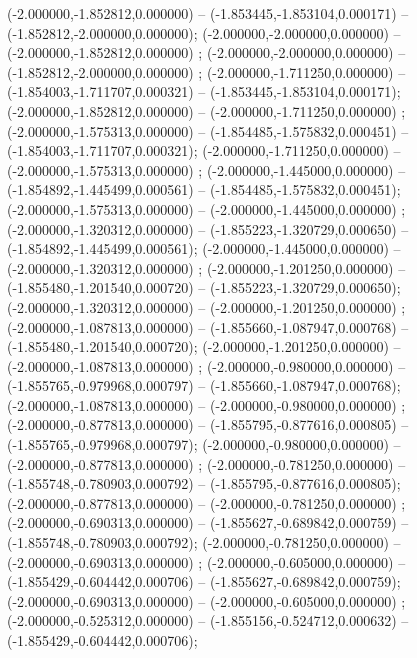  (-2.000000,-1.852812,0.000000) -- (-1.853445,-1.853104,0.000171) -- (-1.852812,-2.000000,0.000000);
 (-2.000000,-2.000000,0.000000) -- (-2.000000,-1.852812,0.000000) ;
 (-2.000000,-2.000000,0.000000) -- (-1.852812,-2.000000,0.000000) ;
 (-2.000000,-1.711250,0.000000) -- (-1.854003,-1.711707,0.000321) -- (-1.853445,-1.853104,0.000171);
 (-2.000000,-1.852812,0.000000) -- (-2.000000,-1.711250,0.000000) ;
 (-2.000000,-1.575313,0.000000) -- (-1.854485,-1.575832,0.000451) -- (-1.854003,-1.711707,0.000321);
 (-2.000000,-1.711250,0.000000) -- (-2.000000,-1.575313,0.000000) ;
 (-2.000000,-1.445000,0.000000) -- (-1.854892,-1.445499,0.000561) -- (-1.854485,-1.575832,0.000451);
 (-2.000000,-1.575313,0.000000) -- (-2.000000,-1.445000,0.000000) ;
 (-2.000000,-1.320312,0.000000) -- (-1.855223,-1.320729,0.000650) -- (-1.854892,-1.445499,0.000561);
 (-2.000000,-1.445000,0.000000) -- (-2.000000,-1.320312,0.000000) ;
 (-2.000000,-1.201250,0.000000) -- (-1.855480,-1.201540,0.000720) -- (-1.855223,-1.320729,0.000650);
 (-2.000000,-1.320312,0.000000) -- (-2.000000,-1.201250,0.000000) ;
 (-2.000000,-1.087813,0.000000) -- (-1.855660,-1.087947,0.000768) -- (-1.855480,-1.201540,0.000720);
 (-2.000000,-1.201250,0.000000) -- (-2.000000,-1.087813,0.000000) ;
 (-2.000000,-0.980000,0.000000) -- (-1.855765,-0.979968,0.000797) -- (-1.855660,-1.087947,0.000768);
 (-2.000000,-1.087813,0.000000) -- (-2.000000,-0.980000,0.000000) ;
 (-2.000000,-0.877813,0.000000) -- (-1.855795,-0.877616,0.000805) -- (-1.855765,-0.979968,0.000797);
 (-2.000000,-0.980000,0.000000) -- (-2.000000,-0.877813,0.000000) ;
 (-2.000000,-0.781250,0.000000) -- (-1.855748,-0.780903,0.000792) -- (-1.855795,-0.877616,0.000805);
 (-2.000000,-0.877813,0.000000) -- (-2.000000,-0.781250,0.000000) ;
 (-2.000000,-0.690313,0.000000) -- (-1.855627,-0.689842,0.000759) -- (-1.855748,-0.780903,0.000792);
 (-2.000000,-0.781250,0.000000) -- (-2.000000,-0.690313,0.000000) ;
 (-2.000000,-0.605000,0.000000) -- (-1.855429,-0.604442,0.000706) -- (-1.855627,-0.689842,0.000759);
 (-2.000000,-0.690313,0.000000) -- (-2.000000,-0.605000,0.000000) ;
 (-2.000000,-0.525312,0.000000) -- (-1.855156,-0.524712,0.000632) -- (-1.855429,-0.604442,0.000706);
